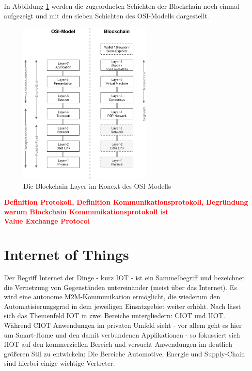 In Abbildung \ref{fig:chapter02:osi_blockchain} werden die zugeordneten Schichten der Blockchain noch einmal aufgezeigt und mit den sieben Schichten des \ac{OSI}-Modells dargestellt.

\begin{figure}[htbp]
 \centering
 \includegraphics[width=0.6\textwidth]{gfx/osi_blockchain.png}
 \caption{Die Blockchain-Layer im Konext des OSI-Modells}
 \label{fig:chapter02:osi_blockchain}
\end{figure}

\cite{osi2014}
\textbf{\textcolor{red}{
  Definition Protokoll, Definition Kommunikationsprotokoll, Begründung warum Blockchain Kommunikationsprotokoll ist\\
  Value Exchange Protocol
}}




%
%
\section{Internet of Things}
\label{sec:fundamentals:iot}
Der Begriff Internet der Dinge - kurz IOT - ist ein Sammelbegriff und bezeichnet die Vernetzung von Gegenständen untereinander (meist über das Internet). Es wird eine autonome \ac{M2M}-Kommunikation ermöglicht, die wiederum den Automatisierungsgrad in dem jeweiligen Einsatzgebiet weiter erhöht. Nach \cite{deloitte2018} lässt sich das Themenfeld \ac{IOT} in zwei Bereiche untergliedern: \ac{CIOT} und \ac{IIOT}. Während \ac{CIOT} Anwendungen im privaten Umfeld sieht - vor allem geht es hier um Smart-Home und den damit verbundenen Applikationen - so fokussiert sich \ac{IIOT} auf den kommerziellen Bereich und versucht Anwendungen im deutlich größeren Stil zu entwickeln: Die Bereiche Automotive, Energie und Supply-Chain sind hierbei einige wichtige Vertreter.\\

